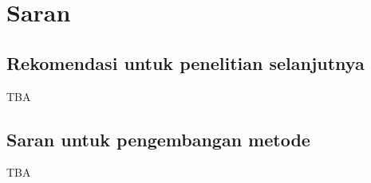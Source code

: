 \section{Saran}

\subsection{Rekomendasi untuk penelitian selanjutnya}

TBA

\subsection{Saran untuk pengembangan metode}

TBA

\newpage